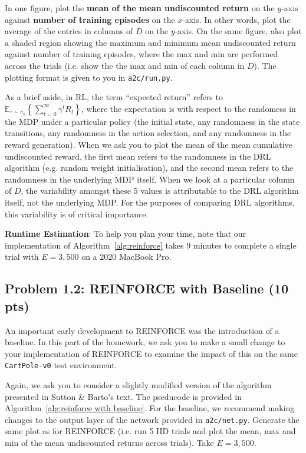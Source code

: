 \documentclass[12pt]{article}
\begin{document}
In one figure, plot the \textbf{mean of the mean undiscounted return} on the $y$-axis against \textbf{number of training episodes} on the $x$-axis. In other words, plot the average of the entries in columns of $D$ on the $y$-axis. On the same figure, also plot a shaded region showing the maximum and minimum mean undiscounted return against number of training episodes, where the max and min are performed across the trials (i.e. show the the max and min of each column in $D$). The plotting format is given to you in \texttt{a2c/run.py}.

As a brief aside, in RL, the term ``expected return'' refers to $\mathbb{E}_{\tau \sim \pi_\theta}\left\{\sum_{t=0}^\infty \gamma^t R_t\right\}$, where the expectation is with respect to the randomess in the MDP under a particular policy (the initial state, any randomness in the state transitions, any randomness in the action selection, and any randomness in the reward generation). When we ask you to plot the mean of the mean cumulative undiscounted reward, the first mean refers to the randomness in the DRL algorithm (e.g. random weight initialisation), and the second mean refers to the randomness in the underlying MDP itself. When we look at a particular column of $D$, the variability amongst these 5 values is attributable to the DRL algorithm itself, not the underlying MDP. For the purposes of comparing DRL algorithms, this variability is of critical importance. 

\textbf{Runtime Estimation}: To help you plan your time, note that our implementation of Algorithm~\ref{alg:reinforce} takes 9 minutes to complete a single trial with $E=3,500$ on a 2020 MacBook Pro.

\subsection*{Problem 1.2: REINFORCE with Baseline (10 pts)}
An important early development to REINFORCE was the introduction of a baseline. In this part of the homework, we ask you to make a small change to your implementation of REINFORCE to examine the impact of this on the same \texttt{CartPole-v0} test environment.

Again, we ask you to consider a slightly modified version of the algorithm presented in Sutton \& Barto's text. The pseducode is provided in Algorithm~\ref{alg:reinforce with baseline}. For the baseline, we recommend making changes to the output layer of the network provided in \texttt{a2c/net.py}. Generate the same plot as for REINFORCE (i.e. run 5 IID trials and plot the mean, max and min of the mean undiscounted returns across trials). Take $E=3,500$.
\end{document}
